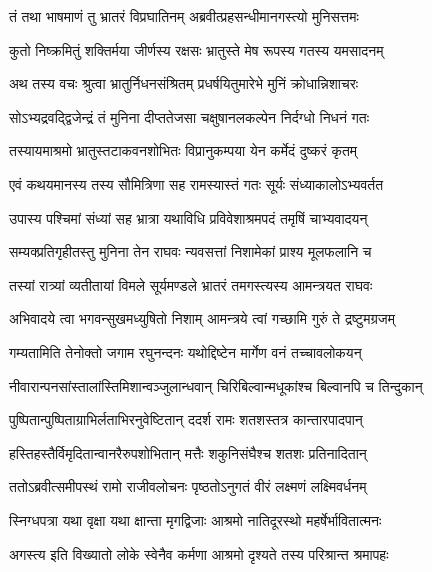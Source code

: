 \twolineshloka
{तं तथा भाषमाणं तु भ्रातरं विप्रघातिनम्}
{अब्रवीत्प्रहसन्धीमानगस्त्यो मुनिसत्तमः} %

\twolineshloka
{कुतो निष्क्रमितुं शक्तिर्मया जीर्णस्य रक्षसः}
{भ्रातुस्ते मेष रूपस्य गतस्य यमसादनम्} %

\twolineshloka
{अथ तस्य वचः श्रुत्वा भ्रातुर्निधनसंश्रितम्}
{प्रधर्षयितुमारेभे मुनिं क्रोधान्निशाचरः} %

\twolineshloka
{सोऽभ्यद्रवद्द्विजेन्द्रं तं मुनिना दीप्ततेजसा}
{चक्षुषानलकल्पेन निर्दग्धो निधनं गतः} %

\twolineshloka
{तस्यायमाश्रमो भ्रातुस्तटाकवनशोभितः}
{विप्रानुकम्पया येन कर्मेदं दुष्करं कृतम्} %

\twolineshloka
{एवं कथयमानस्य तस्य सौमित्रिणा सह}
{रामस्यास्तं गतः सूर्यः संध्याकालोऽभ्यवर्तत} %

\twolineshloka
{उपास्य पश्चिमां संध्यां सह भ्रात्रा यथाविधि}
{प्रविवेशाश्रमपदं तमृषिं चाभ्यवादयन्} %

\twolineshloka
{सम्यक्प्रतिगृहीतस्तु मुनिना तेन राघवः}
{न्यवसत्तां निशामेकां प्राश्य मूलफलानि च} %

\twolineshloka
{तस्यां रात्र्यां व्यतीतायां विमले सूर्यमण्डले}
{भ्रातरं तमगस्त्यस्य आमन्त्रयत राघवः} %

\twolineshloka
{अभिवादये त्वा भगवन्सुखमध्युषितो निशाम्}
{आमन्त्रये त्वां गच्छामि गुरुं ते द्रष्टुमग्रजम्} %

\twolineshloka
{गम्यतामिति तेनोक्तो जगाम रघुनन्दनः}
{यथोद्दिष्टेन मार्गेण वनं तच्चावलोकयन्} %

\twolineshloka
{नीवारान्पनसांस्तालांस्तिमिशान्वञ्जुलान्धवान्}
{चिरिबिल्वान्मधूकांश्च बिल्वानपि च तिन्दुकान्} %

\twolineshloka
{पुष्पितान्पुष्पिताग्राभिर्लताभिरनुवेष्टितान्}
{ददर्श रामः शतशस्तत्र कान्तारपादपान्} %

\twolineshloka
{हस्तिहस्तैर्विमृदितान्वानरैरुपशोभितान्}
{मत्तैः शकुनिसंघैश्च शतशः प्रतिनादितान्} %

\twolineshloka
{ततोऽब्रवीत्समीपस्थं रामो राजीवलोचनः}
{पृष्ठतोऽनुगतं वीरं लक्ष्मणं लक्ष्मिवर्धनम्} %

\twolineshloka
{स्निग्धपत्रा यथा वृक्षा यथा क्षान्ता मृगद्विजाः}
{आश्रमो नातिदूरस्थो महर्षेर्भावितात्मनः} %

\twolineshloka
{अगस्त्य इति विख्यातो लोके स्वेनैव कर्मणा}
{आश्रमो दृश्यते तस्य परिश्रान्त श्रमापहः} %

